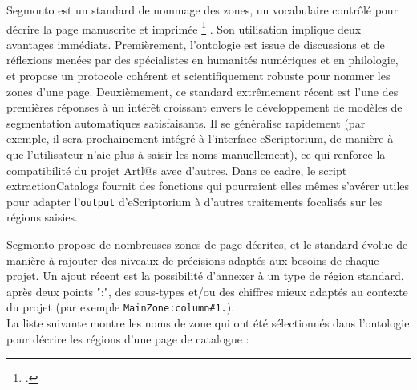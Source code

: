 \documentclass[a4paper,12pt,twoside]{book}
\begin{document}
Segmonto est un standard de nommage des zones, un vocabulaire contrôlé pour décrire la page manuscrite et imprimée
\footcite{gabayFourthParadigmDigital2022,gabayFourthParadigmDigital2022}
. Son utilisation implique deux avantages immédiats. Premièrement, l'ontologie est issue de discussions et de réflexions menées par des spécialistes en humanités numériques et en philologie, et propose un protocole cohérent et scientifiquement robuste pour nommer les zones d'une page. Deuxièmement, ce standard extrêmement récent est l'une des premières réponses à un intérêt croissant envers le développement de modèles de segmentation automatiques satisfaisants. Il se généralise rapidement (par exemple, il sera prochainement intégré à l'interface eScriptorium, de manière à que l'utilisateur n'aie plus à saisir les noms manuellement), ce qui renforce la compatibilité du projet Artl@s avec d'autres. Dans ce cadre, le script extractionCatalogs fournit des fonctions qui pourraient elles mêmes s'avérer utiles pour adapter l'\texttt{output} d'eScriptorium à d'autres traitements focalisés sur les régions saisies.

Segmonto propose de nombreuses zones de page décrites, et le standard évolue de manière à rajouter des niveaux de précisions adaptés aux besoins de chaque projet. Un ajout récent est la possibilité d'annexer à un type de région standard, après deux points ":", des sous-types et/ou des chiffres mieux adaptés au contexte du projet (par exemple \texttt{MainZone:column\#1.}).\\

La liste suivante montre les noms de zone qui ont été sélectionnés dans l'ontologie pour décrire les régions d'une page de catalogue : 
\end{document}

